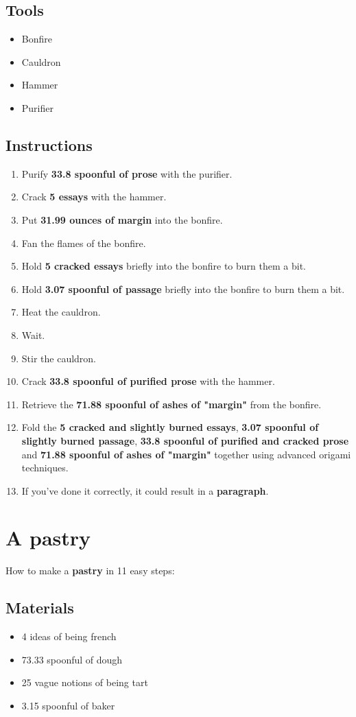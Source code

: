 \documentclass{article}
\begin{document}
\subsection{Tools}\begin{itemize}
\item 
Bonfire
\item 
Cauldron
\item 
Hammer
\item 
Purifier
\end{itemize}
\subsection{Instructions}\begin{enumerate}
\item 
Purify \textbf{33.8 spoonful of prose} with the purifier.
\item 
Crack \textbf{5 essays} with the hammer.
\item 
Put \textbf{31.99 ounces of margin} into the bonfire.
\item 
Fan the flames of the bonfire.
\item 
Hold \textbf{5 cracked essays} briefly into the bonfire to burn them a bit.
\item 
Hold \textbf{3.07 spoonful of passage} briefly into the bonfire to burn them a bit.
\item 
Heat the cauldron.
\item 
Wait.
\item 
Stir the cauldron.
\item 
Crack \textbf{33.8 spoonful of purified prose} with the hammer.
\item 
Retrieve the \textbf{71.88 spoonful of ashes of "margin"} from the bonfire.
\item 
Fold the \textbf{5 cracked and slightly burned essays}, \textbf{3.07 spoonful of slightly burned passage}, \textbf{33.8 spoonful of purified and cracked prose} and \textbf{71.88 spoonful of ashes of "margin"} together using advanced origami techniques.
\item 
If you've done it correctly, it could result in a \textbf{paragraph}.
\end{enumerate}
\newpage
\section{A pastry}How to make a \textbf{pastry} in 11 easy steps:

\subsection{Materials}\begin{itemize}
\item 
4 ideas of being french
\item 
73.33 spoonful of dough
\item 
25 vague notions of being tart
\item 
3.15 spoonful of baker
\end{itemize}
\end{document}
